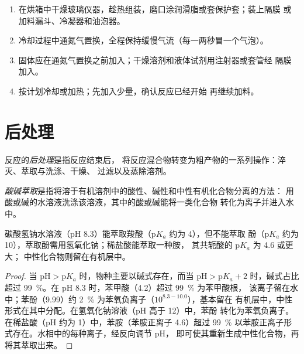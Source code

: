 \begin{method}[在氮气保护下建立干燥反应装置]\label{met:b2:lab-techniques-2:anhydrous}
\begin{enumerate}
  \item 在烘箱中干燥玻璃仪器，趁热组装，磨口涂润滑脂或套保护套；装上隔膜
        或加料漏斗、冷凝器和油泡器。
  \item 冷却过程中通氮气置换，全程保持缓慢气流（每一两秒冒一个气泡）。
  \item 固体应在通氮气置换之前加入；干燥溶剂和液体试剂用注射器或套管经
        隔膜加入。
  \item 按计划冷却或加热；先加入少量，确认反应已经开始
        再继续加料。
\end{enumerate}
\end{method}

\section{后处理}

\begin{definition}[后处理]\label{def:b2:lab-techniques-2:work-up}
反应的\emph{后处理}是指反应结束后，
将反应混合物转变为粗产物的一系列操作：淬灭、萃取与洗涤、干燥、
过滤以及蒸除溶剂。
\end{definition}

\begin{definition}[酸碱萃取]\label{def:b2:lab-techniques-2:acid-base-extraction}
\emph{酸碱萃取}是指将溶于有机溶剂中的酸性、碱性和中性有机化合物分离的方法：
用酸或碱的水溶液洗涤该溶液，其中的酸或碱能将一类化合物
转化为离子并进入水中。
\end{definition}

\begin{proposition}[各物质的去向]\label{prop:b2:lab-techniques-2:acid-base-extraction}
碳酸氢钠水溶液（pH 8.3）能萃取羧酸（$\mathrm pK_a$ 约为 4），但不能萃取
酚（$\mathrm pK_a$ 约为 10），萃取酚需用氢氧化钠；稀盐酸能萃取一种胺，
其共轭酸的 $\mathrm pK_a$ 为 4.6 或更大；
中性化合物则留在有机层中。
\end{proposition}

\begin{proof}
当 $\mathrm{pH} > \mathrm pK_a$ 时，物种主要以碱式存在，而当
$\mathrm{pH} > \mathrm pK_a + 2$ 时，碱式占比超过 99~\%。在 pH 8.3 时，苯甲酸（4.2）超过 99~\% 为苯甲酸根，
该离子留在水中；苯酚（9.99）约 2~\% 为苯氧负离子（$10^{8.3 - 10.0}$），基本留在
有机层中，中性形式在其中分配。在氢氧化钠溶液（pH 高于 12）中，苯酚
转化为苯氧负离子。在稀盐酸（pH 约为 1）中，苯胺（苯胺正离子 4.6）超过
99~\% 以苯胺正离子形式存在。水相中的每种离子，经反向调节 pH，
即可使其重新生成中性化合物，再将其萃取出来。
\end{proof}

